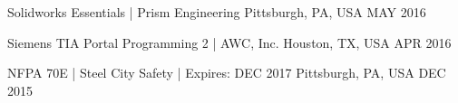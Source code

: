 
\begin{cvhonors}
	
	\cvhonor
	{Solidworks Essentials |} %
	{Prism Engineering} %
	{Pittsburgh, PA, USA} %
	{MAY 2016} %
	
	\cvhonor
	{Siemens TIA Portal Programming 2 |} %
	{AWC, Inc.} %
	{Houston, TX, USA} %
	{APR 2016} %
	
	\cvhonor
	{NFPA 70E |} %
	{Steel City Safety | Expires: DEC 2017} %
	{Pittsburgh, PA, USA} %
	{DEC 2015} %
	
\end{cvhonors}